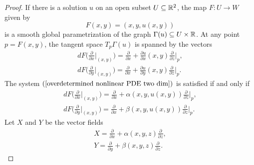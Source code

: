 \begin{proof}
If there is a solution $u$ on an open subset $U\subseteq\mathbb{R}^2$, the map $F:U\to W$ given by
\[F(x,y)=(x,y,u(x,y))\]
is a smooth global parametrization of the graph $\Gamma(u)\subseteq U\times\mathbb{R}$. At any point $p=F(x,y)$, the tangent space $T_p\Gamma(u)$ is spanned by the vectors
\begin{align*}
dF\Big(\frac{\partial}{\partial x}\Big|_{(x,y)}\Big)=\frac{\partial}{\partial x}+\frac{\partial u}{\partial x}(x,y)\frac{\partial}{\partial z}\Big|_p,\\
dF\Big(\frac{\partial}{\partial y}\Big|_{(x,y)}\Big)=\frac{\partial}{\partial x}+\frac{\partial u}{\partial y}(x,y)\frac{\partial}{\partial z}\Big|_p.
\end{align*}
The system $(\ref{overdetermined nonlinear PDE two dim})$ is satisfied if and only if
\begin{equation}
\begin{aligned}\label{overdetermined nonlinear PDE two dim solution-1}
dF\Big(\frac{\partial}{\partial x}\Big|_{(x,y)}\Big)=\frac{\partial}{\partial x}+\alpha(x,y,u(x,y))\frac{\partial}{\partial z}\Big|_p,\\
dF\Big(\frac{\partial}{\partial y}\Big|_{(x,y)}\Big)=\frac{\partial}{\partial x}+\beta(x,y,u(x,y))\frac{\partial}{\partial z}\Big|_p.
\end{aligned}
\end{equation}
Let $X$ and $Y$ be the vector fields
\begin{equation}
\begin{aligned}\label{overdetermined nonlinear PDE two dim solution-2}
X=\frac{\partial}{\partial x}+\alpha(x,y,z)\frac{\partial}{\partial z},\\
Y=\frac{\partial}{\partial y}+\beta(x,y,z)\frac{\partial}{\partial z}.
\end{aligned}
\end{equation}


\end{proof}
